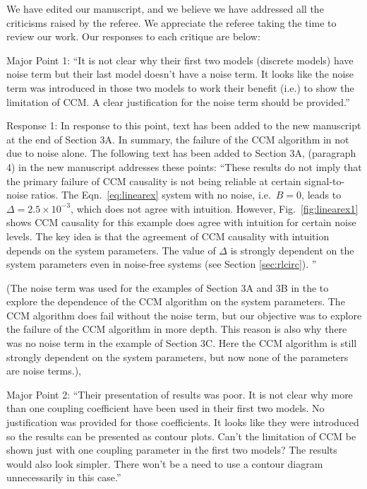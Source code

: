 \documentclass[]{article}
\title{}
\author{}
\begin{document}
\maketitle

We have edited our manuscript, and we believe we have addressed all the criticisms raised by the referee.  We appreciate the referee taking the time to review our work.  Our responses to each critique are below:

Major Point 1: ``It is not clear why their first two models (discrete models) have noise term but their last model doesn't have a noise term. It looks like the noise term was introduced in those two models to work their benefit (i.e.) to show the limitation of CCM. A clear justification for the noise term should be provided.''

Response 1: In response to this point, text has been added to the new manuscript at the end of Section 3A.  In summary, the failure of the CCM algorithm in not due to noise alone.  The following text has been added to Section 3A, (paragraph 4) in the new manuscript addresses these points: ``These results do not imply that the primary failure of CCM causality is not being reliable at certain signal-to-noise ratios.  The Eqn.\ \ref{eq:linearex} system with no noise, i.e.\ $B=0$, leads to $\Delta=2.5\times 10^{-3}$, which does not agree with intuition.  However, Fig.\ \ref{fig:linearex1} shows CCM causality for this example does agree with intuition for certain noise levels.  The key idea is that the agreement of CCM causality with intuition depends on the system parameters.  The value of $\Delta$ is strongly dependent on the system parameters even in noise-free systems (see Section \ref{sec:rlcirc}). ''

(The noise term was used for the examples of Section 3A and 3B in the to explore the dependence of the CCM algorithm on the system parameters.  The CCM algorithm does fail without the noise term, but our objective was to explore the failure of the CCM algorithm in more depth.  This reason is also why there was no noise term in the example of Section 3C.  Here the CCM algorithm is still strongly dependent on the system parameters, but now none of the parameters are noise terms.), 

Major Point 2: ``Their presentation of results was poor. It is not clear why more than one coupling coefficient have been used in their first two models. No justification was provided for those coefficients. It looks like they were introduced so the results can be presented as contour plots.  Can't the limitation of CCM be shown just with one coupling parameter in the first two models? The results would also look simpler. There won't be a need to use a contour diagram unnecessarily in this case.''
\end{document}
